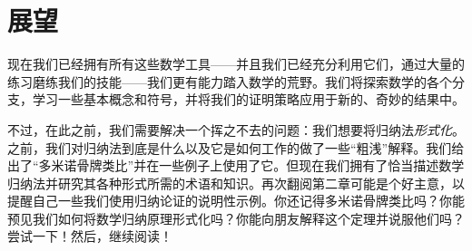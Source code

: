 \section{展望}

现在我们已经拥有所有这些数学工具——并且我们已经充分利用它们，通过大量的练习磨练我们的技能——我们更有能力踏入数学的荒野。我们将探索数学的各个分支，学习一些基本概念和符号，并将我们的证明策略应用于新的、奇妙的结果中。

不过，在此之前，我们需要解决一个挥之不去的问题：我们想要将归纳法\emph{形式化}。之前，我们对归纳法到底是什么以及它是如何工作的做了一些``粗浅''解释。我们给出了``多米诺骨牌类比''并在一些例子上使用了它。但现在我们拥有了恰当描述数学归纳法并研究其各种形式所需的术语和知识。再次翻阅第二章可能是个好主意，以提醒自己一些我们使用归纳论证的说明性示例。你还记得多米诺骨牌类比吗？你能预见我们如何将数学归纳原理形式化吗？你能向朋友解释这个定理并说服他们吗？尝试一下！然后，继续阅读！